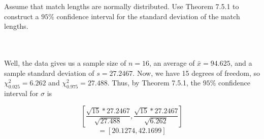 Assume that match lengths are normally distributed. Use Theorem 7.5.1 to construct a $95\%$ confidence
interval for the standard deviation of the match lengths.\\\\

\begin{solution}\renewcommand{\qedsymbol}{}\ \\
    Well, the data gives us a sample size of $n=16$, an average of $\bar{x}=94.625$, and a sample
    standard deviation of $s=27.2467$. Now, we have 15 degrees of freedom, so $\chi^2_{0.025}=6.262$ and
    $\chi^2_{0.975}=27.488$. Thus, by Theorem 7.5.1, the $95\%$ confidence interval for $\sigma$ is
    
    $$[\frac{\sqrt{15}*27.2467}{\sqrt{27.488}},\frac{\sqrt{15}*27.2467}{\sqrt{6.262}}]$$
    $$=[20.1274,42.1699]$$

\end{solution}